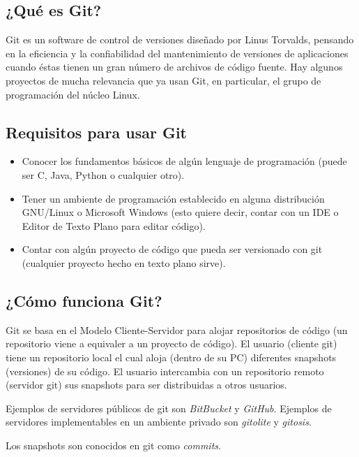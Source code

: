 \documentclass{article}
\begin{document}
\subsection{¿Qué es Git?}

Git es un software de control de versiones diseñado por Linus Torvalds, pensando en la eficiencia y la confiabilidad del mantenimiento de versiones de aplicaciones cuando éstas tienen un gran número de archivos de código fuente. Hay algunos proyectos de mucha relevancia que ya usan Git, en particular, el grupo de programación del núcleo Linux\cite{wikigit}.

\subsection{Requisitos para usar Git}

\begin{itemize}
\item Conocer los fundamentos básicos de algún lenguaje de programación (puede ser C, Java, Python o cualquier otro).
\item Tener un ambiente de programación establecido en alguna distribución GNU/Linux o Microsoft Windows (esto quiere decir, contar con un IDE o Editor de Texto Plano para editar código).
\item Contar con algún proyecto de código que pueda ser versionado con git (cualquier proyecto hecho en texto plano sirve).
\end{itemize}

\subsection{¿Cómo funciona Git?}

Git se basa en el Modelo Cliente-Servidor para alojar
repositorios de código (un repositorio viene a equivaler a un proyecto de código). El usuario (cliente git) tiene un repositorio local el cual aloja (dentro de su PC) diferentes snapshots (versiones) de su código. El usuario intercambia con un repositorio remoto (servidor git) sus snapshots para ser distribuidas a otros
usuarios.

Ejemplos de servidores públicos de git son \textit{BitBucket} y \textit{GitHub}. Ejemplos de servidores implementables en un ambiente privado son \textit{gitolite} y \textit{gitosis}.

Los snapshots son conocidos en git como \textit{commits}.

\pagebreak
\end{document}
